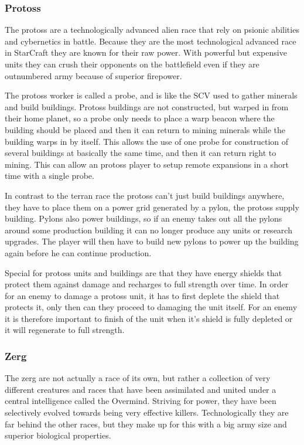\subsubsection{Protoss}
The protoss are a technologically advanced alien race that rely on psionic
abilities and cybernetics in battle. Because they are the most technological
advanced race in StarCraft they are known for their raw power. With powerful but
expensive units they can crush their opponents on the battlefield even if they
are outnumbered army because of superior firepower.

The protoss worker is called a probe, and is like the SCV used to gather
minerals and build buildings. Protoss buildings are not constructed, but warped
in from their home planet, so a probe only needs to place a warp beacon where
the building should be placed and then it can return to mining minerals while
the building warps in by itself. This allows the use of one probe for
construction of several buildings at basically the same time, and then it can
return right to mining. This can allow an protoss player to setup remote
expansions in a short time with a single probe. 

In contrast to the terran race the protoss can't just build buildings anywhere,
they have to place them on a power grid generated by a pylon, the protoss supply
building. Pylons also power buildings, so if an enemy takes out all the pylons
around some production building it can no longer produce any units or research
upgrades. The player will then have to build new pylons to power up the building
again before he can continue production. 

Special for protoss units and buildings are that they have energy shields that
protect them against damage and recharges to full strength over time. In order
for an enemy to damage a protoss unit, it has to first deplete the shield that
protects it, only then can they proceed to damaging the unit itself. For an
enemy it is therefore important to finish of the unit when it's shield is fully
depleted or it will regenerate to full strength. 

\subsubsection{Zerg}
The zerg are not actually a race of its own, but rather a collection of very
different creatures and races that have been assimilated and united under a
central intelligence called the Overmind. Striving for power, they have been
selectively evolved towards being very effective killers. Technologically they
are far behind the other races, but they make up for this with a big army size
and superior biological properties. 

